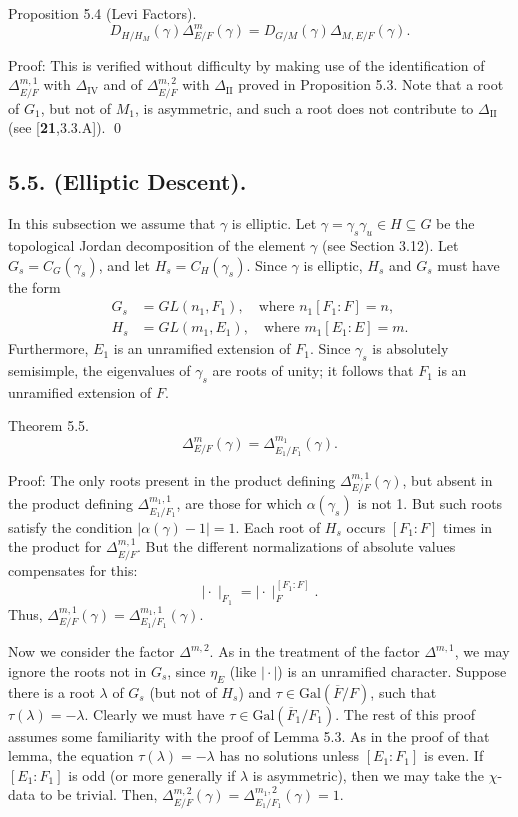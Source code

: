 \documentclass{amsart}
\begin{document}
\bigskip
\proclaim Proposition {5.4} (Levi Factors).
$$D_{H/H_M}(\gamma)\Delta^m_{E/F}(\gamma) = D_{G/M}(\gamma) 
\Delta_{M,E/F}(\gamma).$$
\finishproclaim

\pproclaim Proof:  This is verified without difficulty by making use of the
identification of $\Delta^{m,1}_{E/F}$ with $\Delta_{\text{IV}}$ and 
of $\Delta^{m,2}_{E/F}$ with $\Delta_{\text{II}}$ proved in Proposition
5.3.  Note that a root of $G_1$, but not of $M_1$, is asymmetric,
and such a root does not contribute to $\Delta_{\text{II}}$
(see [{\bf 21},3.3.A]).
\qed
\finishpproclaim

\bigskip
\subsection{5.5. {\smc (Elliptic Descent).}}\nopagebreak
\medskip
\noindent
In this subsection we assume that $\gamma$ is elliptic.
Let
  $ \gamma = \gamma_s \gamma_u \in H \subseteq G $ be
  the topological Jordan decomposition of the element $\gamma$ (see Section 3.12).
Let
  $ G_s = C_G ( \gamma_s) $, and let $H_s =C_H(\gamma_s)$.
Since $\gamma$ is elliptic, $H_s$ and $G_s$ must have the form
\begin{align*}
  G_s &= GL(n_1,F_1),\quad \text{where } n_1[F_1:F] = n,\\
  H_s &= GL(m_1,E_1),\quad \text{where } m_1[E_1:E] = m.
\end{align*}
%
Furthermore, $E_1$ is an unramified extension of $F_1$.  Since
$\gamma_s$ is absolutely semisimple, the eigenvalues of $\gamma_s$
are roots of unity; it follows that $F_1$ is an unramified
extension of $F$.

\proclaim Theorem {5.5}.
%
$$
  \Delta_{E/F}^m (\gamma) = \Delta_{E_1/F_1}^{m_1}(\gamma).$$
%
\finishproclaim

\pproclaim Proof:
The only roots present in the product defining $\Delta^{m,1}_{E/F}(\gamma)$,
but absent in the product defining $\Delta^{m_1,1}_{E_1/F_1}$, are those
for which $\alpha(\gamma_s)$ is not 1.  But such roots satisfy the condition
$|\alpha(\gamma)-1| = 1$.  Each root of $H_s$ occurs $[F_1:F]$
times in the product for $\Delta^{m,1}_{E/F}$.  But the different
normalizations of absolute values compensates for this:
$$\mid\cdot\mid_{F_1} = \mid\cdot\mid_{F}^{[F_1:F]}.$$
Thus, $\Delta^{m,1}_{E/F}(\gamma) = \Delta^{m_1,1}_{E_1/F_1}(\gamma)$.

Now we consider the factor $\Delta^{m,2}$.  As in the treatment
of the factor $\Delta^{m,1}$, we may ignore the roots not
in $G_s$, since $\eta_E$ (like $\mid\cdot\mid$) is an unramified
character.  Suppose there is a root $\lambda$ of $G_s$ (but not of $H_s$)
and $\tau\in \text{Gal}(\overline F/F)$, 
such that $\tau(\lambda) = -\lambda$.  Clearly
we must have $\tau\in\text{Gal}(\overline F_1/F_1)$.  The rest
of this proof assumes some familiarity with the proof of Lemma 5.3.
As in the proof of that lemma,
the equation $\tau(\lambda) =-\lambda$ has no solutions
unless $[E_1:F_1]$ is even.  If $[E_1:F_1]$ is odd (or more generally if
$\lambda$ is asymmetric), then we may take the $\chi$-data to be trivial.
Then, $\Delta^{m,2}_{E/F}(\gamma) = \Delta^{m_1,2}_{E_1/F_1}(\gamma) = 1$.
\end{document}
